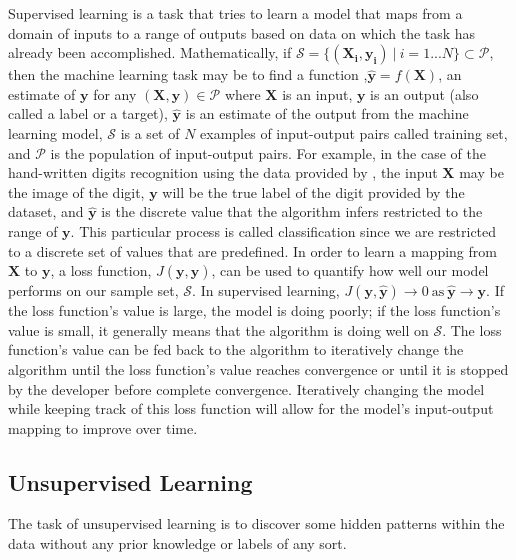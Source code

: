Supervised learning is a task that tries to learn a model that maps from a domain of inputs to a range of outputs based on data on which the task has already been accomplished. Mathematically, if $\mathcal{S} =\{ ( \mathbf{X_i}, \mathbf{y_i} ) \ | \ i = 1...N\} \subset \mathcal{P}$, then the machine learning task may be to find a function ,$ \mathbf{\hat{y}} = f(\mathbf{X}) $, an estimate of $\mathbf{y}$ for any $(\mathbf{X}, \mathbf{y}) \in \mathcal{P}$ where $\mathbf{X}$ is an input, $\mathbf{y}$ is an output (also called a label or a target), $\mathbf{\hat{y}}$  is an estimate of the output from the machine learning model, $\mathcal{S}$ is a set of $N$ examples of input-output pairs called training set, and $\mathcal{P}$ is the population of input-output pairs. For example, in the case of the hand-written digits recognition using the data provided by \citet{lecun1998mnist}, the input $\mathbf{X}$ may be the image of the digit, $\mathbf{y}$ will be the true label of the digit provided by the dataset, and $\mathbf{\hat{y}}$ is the discrete value that the algorithm infers restricted to the range of $\mathbf{y}$. This particular process is called classification since we are restricted to a discrete set of values that are predefined. In order to learn a mapping from $\mathbf{X}$ to $\mathbf{y}$, a loss function, $J(\mathbf{y}, \mathbf{\hat{y}})$, can be used to quantify how well our model performs on our sample set, $\mathcal{S}$. In supervised learning, $J(\mathbf{y}, \mathbf{\hat{y}}) \rightarrow 0 \ \text{as} \ \mathbf{\hat{y}} \rightarrow \mathbf{y}$. If the loss function's value is large, the model is doing poorly; if the loss function's value is small, it generally means that the algorithm is doing well on $\mathcal{S}$. The loss function's value can be fed back to the algorithm to iteratively change the algorithm until the loss function's value reaches convergence or until it is stopped by the developer before complete convergence. Iteratively changing the model while keeping track of this loss function will allow for the model's input-output mapping to improve over time. 

\subsection{Unsupervised Learning}

The task of unsupervised learning is to discover some hidden patterns within the data without any prior knowledge or labels of any sort. 

